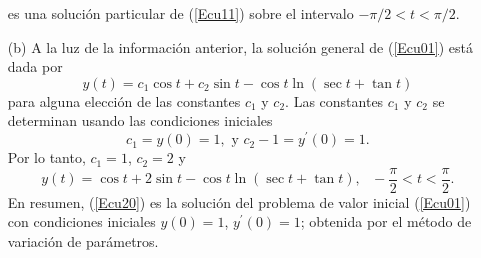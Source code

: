 \documentclass[12pt]{article}
\begin{document}
\begin{itemize}
es una solución particular de (\ref{Ecu11}) sobre el intervalo $-\pi/2<t<\pi/2$.
\item[(b)] A la luz de la información anterior, la solución general de (\ref{Ecu01}) está dada por
\begin{equation}
y(t)=c_{1}\cos t+c_{2}\sin t-\cos t\ln(\sec t+\tan t)
\label{Ecu18}
\end{equation}
para alguna elección de las constantes $c_{1}$ y $c_{2}$. Las constantes $c_{1}$ y $c_{2}$ se determinan 
usando las condiciones iniciales
\begin{equation}
c_{1}=y(0)=1,\mbox{\ y\ }c_{2}-1=y^{\prime}(0)=1.
\label{Ecu19}
\end{equation}
Por lo tanto, $c_{1}=1$, $c_{2}=2$ y
\begin{equation}
y(t)=\cos t+2\sin t-\cos t\ln(\sec t+\tan t),\,\,\,\,-\frac{\pi}{2}<t<\frac{\pi}{2}.
\label{Ecu20}
\end{equation}
En resumen, (\ref{Ecu20}) es la solución del problema de valor inicial (\ref{Ecu01}) con condiciones 
iniciales $y(0)=1$, $y^{\prime}(0)=1$; obtenida por el método de variación de parámetros.
\end{itemize}

\newpage
\end{document}
